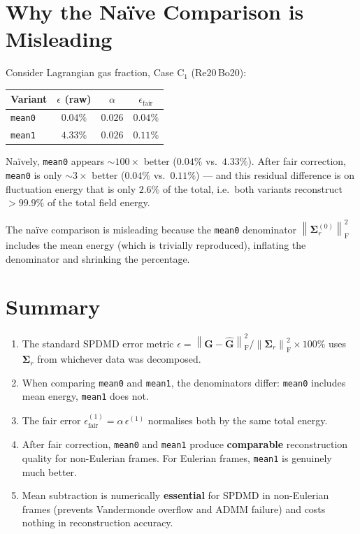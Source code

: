 \documentclass[11pt,a4paper]{article}
\newcommand{\norm}[1]{\left\lVert #1 \right\rVert}
\newcommand{\Fro}{\mathrm{F}}
\newcommand{\Sigmat}{\bm{\Sigma}}
\begin{document}
\section{Why the Na\"ive Comparison is Misleading}

Consider Lagrangian gas fraction, Case C$_1$ (Re20\,Bo20):
\begin{center}
\begin{tabular}{@{}lccc@{}}
\toprule
Variant & $\epsilon$ (raw) & $\alpha$ & $\epsilon_{\mathrm{fair}}$ \\
\midrule
\texttt{mean0} & $0.04\%$ & $0.026$ & $0.04\%$ \\
\texttt{mean1} & $4.33\%$ & $0.026$ & $0.11\%$ \\
\bottomrule
\end{tabular}
\end{center}

Na\"ively, \texttt{mean0} appears $\sim\!100\times$ better ($0.04\%$ vs.\ $4.33\%$).  After fair correction, \texttt{mean0} is only $\sim\!3\times$ better ($0.04\%$ vs.\ $0.11\%$) — and this residual difference is on fluctuation energy that is only $2.6\%$ of the total, i.e.\ both variants reconstruct $>99.9\%$ of the total field energy.

The na\"ive comparison is misleading because the \texttt{mean0} denominator $\norm{\Sigmat_r^{(0)}}_\Fro^2$ includes the mean energy (which is trivially reproduced), inflating the denominator and shrinking the percentage.

\section{Summary}

\begin{enumerate}
\item The standard SPDMD error metric $\epsilon = \norm{\bm{G}-\hat{\bm{G}}}_\Fro^2 / \norm{\Sigmat_r}_\Fro^2 \times 100\%$ uses $\Sigmat_r$ from whichever data was decomposed.
\item When comparing \texttt{mean0} and \texttt{mean1}, the denominators differ: \texttt{mean0} includes mean energy, \texttt{mean1} does not.
\item The fair error $\epsilon_{\mathrm{fair}}^{(1)} = \alpha\,\epsilon^{(1)}$ normalises both by the same total energy.
\item After fair correction, \texttt{mean0} and \texttt{mean1} produce \textbf{comparable} reconstruction quality for non-Eulerian frames.  For Eulerian frames, \texttt{mean1} is genuinely much better.
\item Mean subtraction is numerically \textbf{essential} for SPDMD in non-Eulerian frames (prevents Vandermonde overflow and ADMM failure) and costs nothing in reconstruction accuracy.
\end{enumerate}
\end{document}
